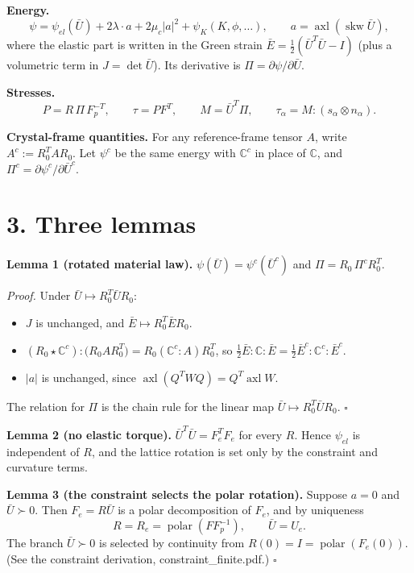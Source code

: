 \documentclass[
  11pt,
]{article}
\providecommand{\tightlist}{%
  \setlength{\itemsep}{0pt}\setlength{\parskip}{0pt}}
\begin{document}
\textbf{Energy.}
\[\psi=\psi_{el}(\bar U)+2\lambda\cdot a+2\mu_c|a|^2+\psi_K(K,\phi,\dots),\qquad a=\operatorname{axl}(\operatorname{skw}\bar U),\]
where the elastic part is written in the Green strain
\(\bar E=\tfrac12(\bar U^T\bar U-I)\) (plus a volumetric term in
\(J=\det\bar U\)). Its derivative is
\(\Pi=\partial\psi/\partial\bar U\).

\textbf{Stresses.}
\[P=R\,\Pi\,F_p^{-T},\qquad \tau=PF^T,\qquad M=\bar U^T\Pi,\qquad \tau_\alpha=M:(s_\alpha\otimes n_\alpha).\]

\textbf{Crystal-frame quantities.} For any reference-frame tensor \(A\),
write \(A^c:=R_0^TAR_0\). Let \(\psi^c\) be the same energy with
\(\mathbb C^c\) in place of \(\mathbb C\), and
\(\Pi^c=\partial\psi^c/\partial\bar U^c\).

\hypertarget{three-lemmas}{%
\section{3. Three lemmas}\label{three-lemmas}}

\textbf{Lemma 1 (rotated material law).}
\(\psi(\bar U)=\psi^c(\bar U^c)\) and \(\Pi=R_0\,\Pi^cR_0^T\).

\emph{Proof.} Under \(\bar U\mapsto R_0^T\bar UR_0\):

\begin{itemize}
\tightlist
\item
  \(J\) is unchanged, and \(\bar E\mapsto R_0^T\bar ER_0\).
\item
  \((R_0\star\mathbb C^c):\bigl(R_0AR_0^T\bigr)=R_0(\mathbb C^c:A)R_0^T\),
  so
  \(\tfrac12\bar E:\mathbb C:\bar E=\tfrac12\bar E^c:\mathbb C^c:\bar E^c\).
\item
  \(|a|\) is unchanged, since
  \(\operatorname{axl}(Q^TWQ)=Q^T\operatorname{axl}W\).
\end{itemize}

The relation for \(\Pi\) is the chain rule for the linear map
\(\bar U\mapsto R_0^T\bar UR_0\). \(\square\)

\textbf{Lemma 2 (no elastic torque).} \(\bar U^T\bar U=F_e^TF_e\) for
every \(R\). Hence \(\psi_{el}\) is independent of \(R\), and the
lattice rotation is set only by the constraint and curvature terms.

\textbf{Lemma 3 (the constraint selects the polar rotation).} Suppose
\(a=0\) and \(\bar U\succ0\). Then \(F_e=R\bar U\) is a polar
decomposition of \(F_e\), and by uniqueness
\[R=R_e=\operatorname{polar}(FF_p^{-1}),\qquad \bar U=U_e .\] The branch
\(\bar U\succ0\) is selected by continuity from
\(R(0)=I=\operatorname{polar}(F_e(0))\). (See the constraint derivation,
constraint\_finite.pdf.) \(\square\)
\end{document}
